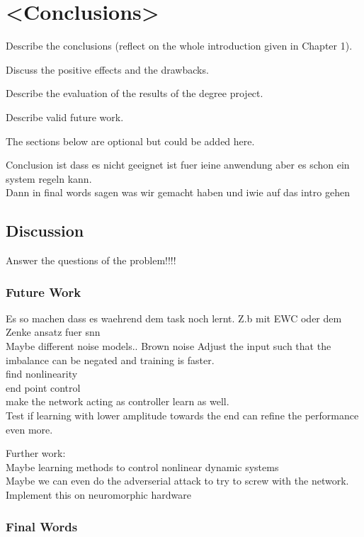 \chapter{<Conclusions>}
Describe the conclusions (reflect on the whole introduction given in Chapter 1).

Discuss the positive effects and the drawbacks.

Describe the evaluation of the results of the degree project.

Describe valid future work.

The sections below are optional but could be added here.


Conclusion ist dass es nicht geeignet ist fuer ieine anwendung aber es schon ein system regeln kann.\\
Dann in final words sagen was wir gemacht haben und iwie auf das intro gehen
\section{Discussion}

Answer the questions of the problem!!!!\\

\subsection{Future Work}
Es so machen dass es waehrend dem task noch lernt. Z.b mit EWC oder dem Zenke ansatz fuer snn\\
Maybe different noise models.. Brown noise
Adjust the input such that the imbalance can be negated and training is faster.\\
find nonlinearity\\
end point control\\
make the network acting as controller learn as well.\\
Test if learning with lower amplitude towards the end can refine the performance even more.\\

Further work:\\
Maybe learning methods to control nonlinear dynamic systems\\
Maybe we can even do the adverserial attack to try to screw with the network.\\
Implement this on neuromorphic hardware\\

\subsection{Final Words}

\listoftodos






